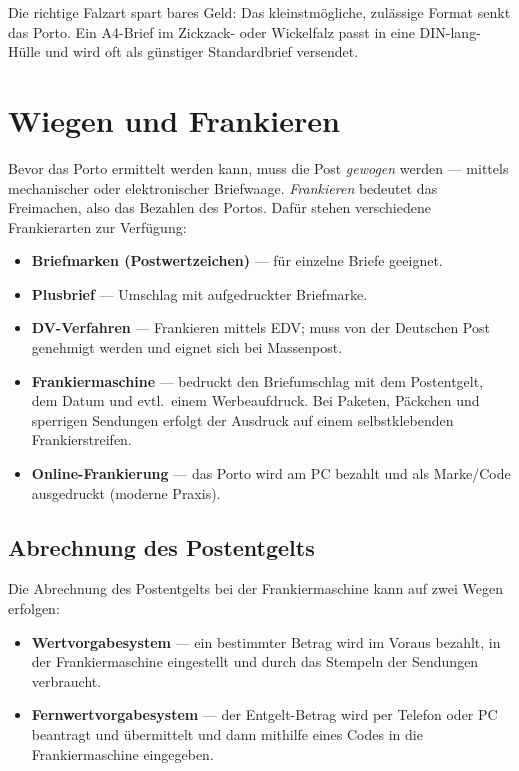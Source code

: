 \documentclass[11pt, a4paper]{article}
\begin{document}
\begin{merksatz}
Die richtige Falzart spart bares Geld: Das kleinstmögliche, zulässige Format senkt das
Porto. Ein A4-Brief im Zickzack- oder Wickelfalz passt in eine DIN-lang-Hülle und wird
oft als günstiger Standardbrief versendet.
\end{merksatz}

\section{Wiegen und Frankieren}

Bevor das Porto ermittelt werden kann, muss die Post \emph{gewogen} werden --- mittels
mechanischer oder elektronischer Briefwaage. \emph{Frankieren} bedeutet das Freimachen,
also das Bezahlen des Portos. Dafür stehen verschiedene Frankierarten zur Verfügung:

\begin{itemize}
  \item \textbf{Briefmarken (Postwertzeichen)} --- für einzelne Briefe geeignet.
  \item \textbf{Plusbrief} --- Umschlag mit aufgedruckter Briefmarke.
  \item \textbf{DV-Verfahren} --- Frankieren mittels EDV; muss von der Deutschen Post genehmigt werden und eignet sich bei Massenpost.
  \item \textbf{Frankiermaschine} --- bedruckt den Briefumschlag mit dem Postentgelt, dem Datum und evtl.\ einem Werbeaufdruck. Bei Paketen, Päckchen und sperrigen Sendungen erfolgt der Ausdruck auf einem selbstklebenden Frankierstreifen.
  \item \textbf{Online-Frankierung} --- das Porto wird am PC bezahlt und als Marke/Code ausgedruckt (moderne Praxis).
\end{itemize}

\subsection{Abrechnung des Postentgelts}

Die Abrechnung des Postentgelts bei der Frankiermaschine kann auf zwei Wegen erfolgen:

\begin{itemize}
  \item \textbf{Wertvorgabesystem} --- ein bestimmter Betrag wird im Voraus bezahlt, in der Frankiermaschine eingestellt und durch das Stempeln der Sendungen verbraucht.
  \item \textbf{Fernwertvorgabesystem} --- der Entgelt-Betrag wird per Telefon oder PC beantragt und übermittelt und dann mithilfe eines Codes in die Frankiermaschine eingegeben.
\end{itemize}
\end{document}
